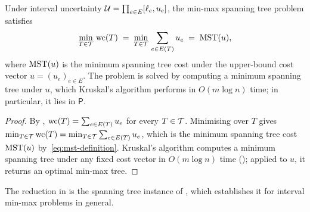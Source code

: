 \begin{corollary}\label{cor:mm-interval-polynomial}
Under interval uncertainty $\mathcal{U} = \prod_{e \in E} [\ell_e, u_e]$, the min-max spanning tree problem satisfies
\[
\min_{T \in \mathcal{T}}\, \mathrm{wc}(T) \;=\; \min_{T \in \mathcal{T}}\, \sum_{e \in E(T)} u_e \;=\; \mathrm{MST}(u),
\]
where $\mathrm{MST}(u)$ is the minimum spanning tree cost under the upper-bound cost vector $u = (u_e)_{e \in E}$.
The problem is solved by computing a minimum spanning tree under $u$, which Kruskal's algorithm performs in $O(m \log n)$ time; in particular, it lies in $\mathsf{P}$.
\end{corollary}

\begin{proof}
By , $\mathrm{wc}(T) = \sum_{e \in E(T)} u_e$ for every $T \in \mathcal{T}$.
Minimising over $T$ gives $\min_{T \in \mathcal{T}} \mathrm{wc}(T) = \min_{T \in \mathcal{T}} \sum_{e \in E(T)} u_e$, which is the minimum spanning tree cost $\mathrm{MST}(u)$ by~\eqref{eq:mst-definition}.
Kruskal's algorithm computes a minimum spanning tree under any fixed cost vector in $O(m \log n)$ time (); applied to $u$, it returns an optimal min-max tree.
\end{proof}

The reduction in  is the spanning tree instance of \cite[Theorem~4.8]{Goerigk2021RCO}, which establishes it for interval min-max problems in general.

%
%

